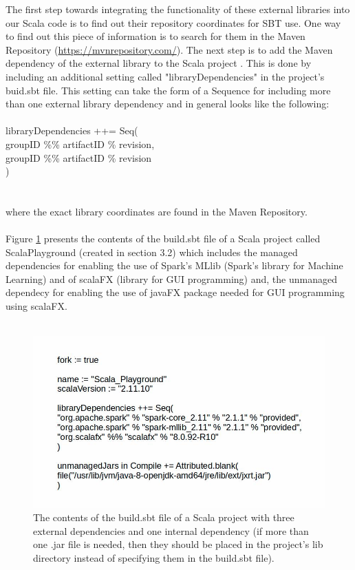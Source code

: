 \documentclass {article}
\begin{document}
The first step towards integrating the functionality of these external libraries into our Scala code is to find out their repository coordinates for SBT use.
 One way to find out this piece of information is to search for them in the Maven Repository (\href{https://mvnrepository.com/}{https://mvnrepository.com/}). 
The next step is to add the Maven dependency of the external library to the Scala project \cite{karau_learning_2015}. 
This is done by including an additional setting called "libraryDependencies" in the project's buid.sbt file.
 This setting can take the form of a Sequence for including more than one external library dependency and in general looks like the following:
\\
\\
libraryDependencies ++= Seq( \\
groupID \%\% artifactID \% revision,\\
groupID \%\% artifactID \% revision\\
)\\
\\
\\
where the exact library coordinates are found in the Maven Repository.
\\
\\
Figure \ref{fig: fig1} presents the contents of the build.sbt file of a Scala project called Scala\underline{\space}Playground (created in section 3.2) which includes the managed dependencies for enabling the use of Spark's MLlib (Spark's library for Machine Learning) and of scalaFX (library for GUI programming) and, the unmanaged dependecy for enabling the use of javaFX package needed for GUI programming using scalaFX.          
\\
\\
\begin{figure} [H]
\includegraphics[width=\linewidth] {fig1.jpg}
\caption{The contents of the build.sbt file of a Scala project with three external dependencies and one internal dependency (if more than one .jar file is needed, then they should be placed in the project's lib directory instead of specifying them in the build.sbt file).}
\label{fig: fig1}
\end{figure}   
\\
\\
\end{document}
